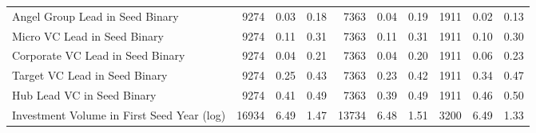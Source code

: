 \begin{table}[!h]
{\begin{tabular}[t]{lrrrrrrrrr}
Angel Group Lead in Seed Binary & 9274 & 0.03 & 0.18 & 7363 & 0.04 & 0.19 & 1911 & 0.02 & 0.13\\
Micro VC Lead in Seed Binary & 9274 & 0.11 & 0.31 & 7363 & 0.11 & 0.31 & 1911 & 0.10 & 0.30\\
Corporate VC Lead in Seed Binary & 9274 & 0.04 & 0.21 & 7363 & 0.04 & 0.20 & 1911 & 0.06 & 0.23\\
Target VC Lead in Seed Binary & 9274 & 0.25 & 0.43 & 7363 & 0.23 & 0.42 & 1911 & 0.34 & 0.47\\
\addlinespace
Hub Lead VC in Seed Binary & 9274 & 0.41 & 0.49 & 7363 & 0.39 & 0.49 & 1911 & 0.46 & 0.50\\
Investment Volume in First Seed Year (log) & 16934 & 6.49 & 1.47 & 13734 & 6.48 & 1.51 & 3200 & 6.49 & 1.33\\
\bottomrule
\end{tabular}}
\end{table}
